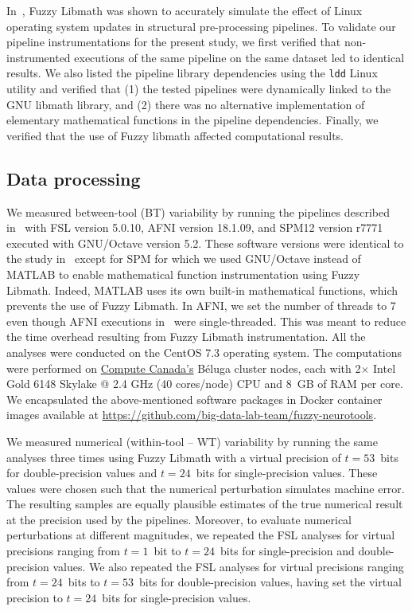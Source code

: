 \documentclass[11pt,onecolumn]{article}
\begin{document}
In~\cite{salari2021accurate}, Fuzzy Libmath was shown to accurately
simulate the effect of Linux operating system updates in structural
pre-processing pipelines. To validate our pipeline instrumentations for the present study, we first verified that non-instrumented
executions of the same pipeline on the same dataset led to identical
results. We also listed the pipeline
library dependencies using the \texttt{ldd} Linux utility and verified that
(1) the tested pipelines were dynamically linked to the GNU libmath library, and 
(2) there was no alternative implementation of elementary mathematical functions in the pipeline dependencies.
Finally, we verified that the use of Fuzzy libmath affected computational results.

\subsection{Data processing}

We measured between-tool (BT) variability by running the pipelines
described in~\cite{bowring2019exploring} with FSL version 5.0.10, AFNI
version 18.1.09, and SPM12 version r7771 executed with GNU/Octave version
5.2. These software versions were identical to the study
in~\cite{bowring2019exploring} except for SPM for which we used GNU/Octave
instead of MATLAB to enable mathematical function instrumentation using
Fuzzy Libmath. Indeed, MATLAB uses its own built-in mathematical functions,
which prevents the use of Fuzzy Libmath. In AFNI, we set the number of
threads to 7 even though AFNI executions
in~\cite{bowring2019exploring} were single-threaded. This was meant to
reduce the time overhead resulting from Fuzzy Libmath instrumentation. All
the analyses were conducted on the CentOS 7.3 operating system. The
computations were performed on \href{https://www.computecanada.ca}{Compute
Canada's} Béluga cluster nodes, each with 2$\times$ Intel Gold 6148 Skylake
@ 2.4 GHz (40 cores/node) CPU and 8~GB of RAM per core. We encapsulated the
above-mentioned software packages in Docker container images available at
\url{https://github.com/big-data-lab-team/fuzzy-neurotools}.

We measured numerical (within-tool -- WT) variability by running the same analyses three
times using Fuzzy Libmath with a virtual precision of $t=53$~bits for
double-precision values and $t=24$~bits for single-precision values. These
values were chosen such that the numerical perturbation simulates machine
error. The resulting samples are equally plausible estimates of
the true numerical result at the precision used by the pipelines. Moreover, to evaluate numerical perturbations at different magnitudes, 
we repeated the FSL analyses for virtual
precisions ranging from $t=1$~bit to $t=24$~bits for single-precision
and double-precision values. We also repeated the FSL analyses for virtual 
precisions ranging from $t=24$~bits to $t=53$~bits for double-precision values, having 
set the virtual precision to $t=24$~bits for single-precision values. 
\end{document}
